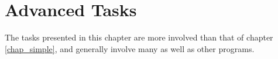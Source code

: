\chapter{Advanced Tasks}
\label{chap_adv}

The tasks presented in this chapter are more involved than that of chapter
\ref{chap_simple}, and generally involve many \nutils{} as well as other
programs.






